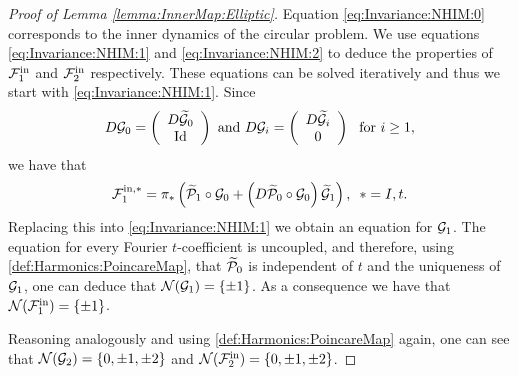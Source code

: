 \begin{proof}[Proof of Lemma \ref{lemma:InnerMap:Elliptic}]
 Equation \eqref{eq:Invariance:NHIM:0} corresponds to the inner dynamics
 of the circular problem. We use equations \eqref{eq:Invariance:NHIM:1}
 and \eqref{eq:Invariance:NHIM:2} to deduce the properties of $\mathcal{F}_1^{\mathrm{in}}$
 and $\mathcal{F}_2^{\mathrm{in}}$ respectively.
  These equations can be solved iteratively and thus we start with \eqref{eq:Invariance:NHIM:1}. Since
  \begin{equation}\label{def:DifferentialG}
    D\mathcal{G}_0=\left(\begin{array}{c}D\widetilde {\mathcal{G}}_0\\ \text{Id}\end{array}\right)\text{ and } D\mathcal{G}_i=\left(\begin{array}{c}D\widetilde {\mathcal{G}}_i\\ 0\end{array}\right)\,\,\text{ for } i\geq 1,
  \end{equation}
  we have that
  \[
  \mathcal{F}_1^{\mathrm{in},\ast}=\pi_\ast\left(\widetilde {\mathcal{P}}_1\circ\mathcal{G}_0+\left(D\widetilde{\mathcal{P}}_0\circ\mathcal{G}_0\right)\widetilde{\mathcal{G}}_1\right),\,\,\,\ast=I,t.
  \]
  Replacing this into \eqref{eq:Invariance:NHIM:1} we obtain an equation for $\mathcal{G}_1$. The equation for every Fourier $t$-coefficient is uncoupled, and therefore, using \eqref{def:Harmonics:PoincareMap}, that $\widetilde{\mathcal{P}}_0$ is independent of $t$ and  the uniqueness of $\mathcal{G}_1$, one can deduce that $\mathcal{N}(\mathcal{G}_1)=\{\pm 1\}$. As a consequence we have that  $\mathcal{N}(\mathcal{F}_1^{\mathrm{in}})=\{\pm 1\}$.

  Reasoning analogously and using \eqref{def:Harmonics:PoincareMap} again, one can see that $\mathcal{N}(\mathcal{G}_2)=\{0,\pm 1,\pm 2\}$ and $\mathcal{N}(\mathcal{F}_2^{\mathrm{in}})=\{0,\pm 1,\pm 2\}$.


\end{proof}
